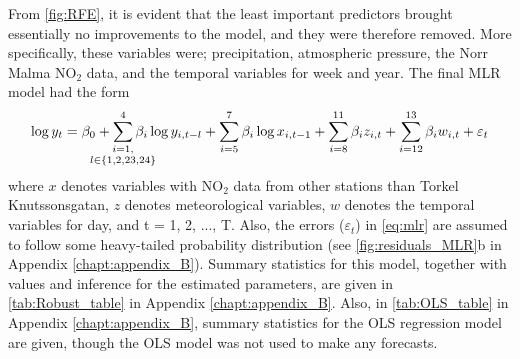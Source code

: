 From \cref{fig:RFE}, it is evident that the least important predictors brought essentially no improvements to the model, and they were therefore removed. More specifically, these variables were; precipitation, atmospheric pressure, the Norr Malma NO$_2$ data, and the temporal variables for week and year. The final MLR model had the form
\begin{align}
\log y_t = \beta_0 + \sum_{\mathclap{\substack{i=1,\\ l\in\{1,2,23,24\}\\}}}^{4} \beta_{i} \log y_{i,t-l} + \sum_{i=5}^{7} \beta_{i} \log x_{i,t-1} + \sum_{i=8}^{11} \beta_{i} z_{i,t}  + \sum_{i=12}^{13} \beta_{i} w_{i,t} +  \varepsilon_t
\label{eq:mlr}
\end{align}
where $x$ denotes variables with NO$_2$ data from other stations than Torkel Knutssonsgatan, $z$ denotes meteorological variables, $w$ denotes the temporal variables for day, and t = 1, 2, ..., T. Also, the errors ($\varepsilon_t$) in \cref{eq:mlr} are assumed to follow some heavy-tailed probability distribution (see \cref{fig:residuals_MLR}b in Appendix \ref{chapt:appendix_B}). Summary statistics for this model, together with values and inference for the estimated parameters, are given in \cref{tab:Robust_table} in Appendix \ref{chapt:appendix_B}. Also, in \cref{tab:OLS_table} in Appendix \ref{chapt:appendix_B}, summary statistics for the OLS regression model are given, though the OLS model was not used to make any forecasts. 





